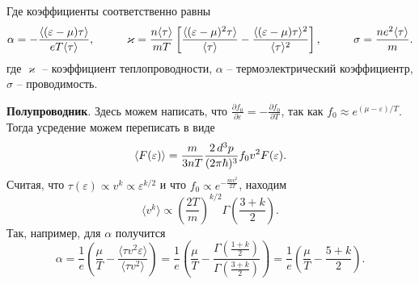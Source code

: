 Где коэффициенты соответственно равны
\begin{equation}
	\alpha = - \frac{\langle (\varepsilon-\mu) \tau \rangle}{e T \langle \tau\rangle},
	\hspace{10 mm} 
	\varkappa = \frac{n \langle \tau\rangle}{m T}\left[
		\frac{\langle (\varepsilon-\mu)^2 \tau\rangle}{\langle \tau\rangle} - \frac{\langle (\varepsilon-\mu) \tau\rangle^2}{\langle \tau\rangle^2}
	\right],
	\hspace{10 mm} 
	\sigma = \frac{n e^2 \langle \tau\rangle}{m}.
\end{equation}
где $\varkappa$ -- коэффициент теплопроводности, $\alpha$ -- термоэлектрический коэффициентр, $\sigma$ -- проводимость. 






\textbf{Полупроводник}. Здесь можем написать, что $\frac{\partial f_0}{\partial \varepsilon} = - \frac{\partial f_0}{\partial T}$, так как $f_0 \approx e^{(\mu-\varepsilon)/T}$. Тогда усредение можем переписать в виде
\begin{equation*}
	\langle F(\varepsilon)\rangle  = \frac{m}{3 n T} \frac{2 \, d^3 p}{(2 \pi \hbar)^3} f_0 v^2 F(\varepsilon).
\end{equation*}
Считая, что $\tau(\varepsilon) \propto v^k \propto \varepsilon^{k/2}$ и что $f_0 \propto e^{-\frac{m v^2}{2T}}$, находим
\begin{equation*}
	\langle v^k\rangle \propto \left(\frac{2 T}{m}\right)^{k/2} \Gamma\left(\frac{3+k}{2}\right).
\end{equation*}
Так, например, для $\alpha$ получится
\begin{equation*}
	\alpha = \frac{1}{e} \left(
		\frac{\mu}{T} - \frac{\langle \tau v^2 \varepsilon\rangle}{\langle  \tau v^2\rangle}
	\right) = \frac{1}{e} \left(
		\frac{\mu}{T} - \frac{\Gamma\left(\frac{1+k}{2}\right)}{\Gamma\left(\frac{3+k}{2}\right)}
	\right) = \frac{1}{e} \left(
		\frac{\mu}{T} - \frac{5+k}{2}
	\right).
\end{equation*}



% 